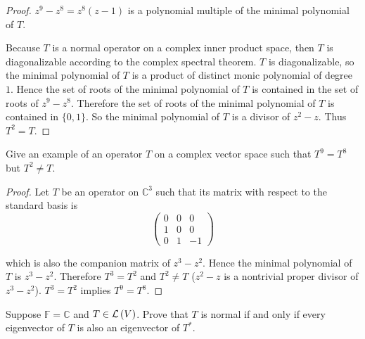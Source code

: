\begin{proof}
    $z^{9} - z^{8} = z^{8}(z - 1)$ is a polynomial multiple of the minimal polynomial of $T$.

    Because $T$ is a normal operator on a complex inner product space, then $T$ is diagonalizable according to the complex spectral theorem. $T$ is diagonalizable, so the minimal polynomial of $T$ is a product of distinct monic polynomial of degree $1$. Hence the set of roots of the minimal polynomial of $T$ is contained in the set of roots of $z^{9} - z^{8}$. Therefore the set of roots of the minimal polynomial of $T$ is contained in $\{ 0, 1 \}$. So the minimal polynomial of $T$ is a divisor of $z^{2} - z$. Thus $T^{2} = T$.
\end{proof}
\newpage

\begin{exercise}
    Give an example of an operator $T$ on a complex vector space such that $T^{9} = T^{8}$ but $T^{2} \ne T$.
\end{exercise}

\begin{proof}
    Let $T$ be an operator on $\mathbb{C}^{3}$ such that its matrix with respect to the standard basis is
    \[
        \begin{pmatrix}
            0 & 0 & 0  \\
            1 & 0 & 0  \\
            0 & 1 & -1
        \end{pmatrix}
    \]

    which is also the companion matrix of $z^{3} - z^{2}$. Hence the minimal polynomial of $T$ is $z^{3} - z^{2}$. Therefore $T^{3} = T^{2}$ and $T^{2}\ne T$ ($z^{2} - z$ is a nontrivial proper divisor of $z^{3} - z^{2}$). $T^{3} = T^{2}$ implies $T^{9} = T^{8}$.
\end{proof}
\newpage

\begin{exercise}
    Suppose $\mathbb{F} = \mathbb{C}$ and $T\in\mathcal{L}\left({V}\right)$. Prove that $T$ is normal if and only if every eigenvector of $T$ is also an eigenvector of $T^{*}$.
\end{exercise}

